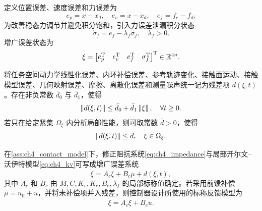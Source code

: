 定义位置误差、速度误差和力误差为
\begin{equation}
  e_p=x-x_d,
  \quad e_v=\dot x-\dot x_d,
  \quad e_f=f_e-f_d .
  \label{eq:ch4_errors}
\end{equation}
为改善稳态力调节并避免积分饱和，引入力误差泄漏积分状态
\begin{equation}
  \dot\sigma_f=e_f-\lambda_f\sigma_f,
  \quad \lambda_f>0 .
  \label{eq:ch4_sigma}
\end{equation}
增广误差状态为
\begin{equation}
  \xi=\begin{bmatrix}e_p^{\mathrm{T}}&e_v^{\mathrm{T}}&e_f^{\mathrm{T}}&\sigma_f^{\mathrm{T}}\end{bmatrix}^{\mathrm{T}}\in\mathbb{R}^{4n} .
  \label{eq:ch4_xi}
\end{equation}

\begin{assumption}[残差项有界性]
\label{ass:ch4_residual}
将任务空间动力学线性化误差、内环补偿误差、参考轨迹变化、接触面运动、接触模型误差、几何映射误差、摩擦、离散化误差和测量噪声统一记为残差项 $d(\xi,t)$。存在非负常数 $\bar d_0$ 与 $\bar d_1$，使得
\begin{equation}
  \left\lVert d(\xi,t)\right\rVert\le \bar d_0+\bar d_1\left\lVert \xi\right\rVert,\quad \forall t\ge0 .
  \label{eq:ch4_residual_bound_affine}
\end{equation}
若只在给定紧集 $\Omega_\xi$ 内分析局部性能，则可取常数 $\bar d>0$，使得
\begin{equation}
  \left\lVert d(\xi,t)\right\rVert\le \bar d,
  \quad \xi\in\Omega_\xi .
  \label{eq:ch4_residual_bound_const}
\end{equation}
\end{assumption}

\begin{lemma}
\label{lem:ch4_augmented_system}
在\cref{ass:ch4_contact_model}下，修正阻抗系统\eqref{eq:ch4_impedance}与局部开尔文--沃伊特模型\eqref{eq:ch4_kv}可写成增广误差系统
\begin{equation}
  \dot\xi=A_c\xi+B_c\mu+d(\xi,t),
  \label{eq:ch4_aug_system_mu}
\end{equation}
其中 $A_c$ 和 $B_c$ 由 $M,C,K_v,K_e,B_e,\lambda_f$ 的局部标称值确定。若采用前馈补偿 $\mu=u_{\mathrm{ff}}+u$，并将未补偿项并入残差，则控制器设计所使用的标称反馈模型为
\begin{equation}
  \dot\xi=A_c\xi+B_cu .
  \label{eq:ch4_nominal_model}
\end{equation}
\end{lemma}

